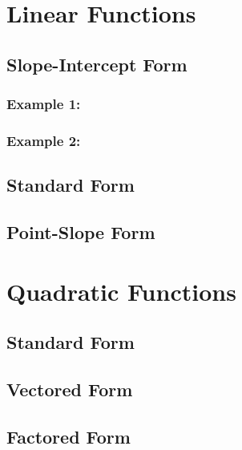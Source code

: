 \documentclass[11pt]{article}
\begin{document}
\vspace{1cm}


\section*{Linear Functions}
	\subsection{Slope-Intercept Form}
		\subsubsection{Example 1:}
		\subsubsection{Example 2:}
	\subsection{Standard Form}
	\subsection{Point-Slope Form}
\section*{Quadratic Functions}
	\subsection{Standard Form}
	\subsection{Vectored Form}
	\subsection{Factored Form}
\end{document}
